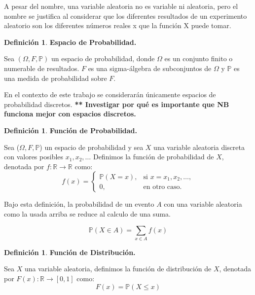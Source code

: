 \documentclass[
 12pt,
 letterpaper,
]{article}
\theoremstyle{teoremaBreak}
\theoremstyle{plain}
\theoremstyle{definition}
\newtheorem{definicion}[teorema]{Definición}
\begin{document}
A pesar del nombre, una variable aleatoria no es variable ni aleatoria,
pero el nombre se justifica al considerar que los diferentes resultados
de un experimento aleatorio son los diferentes números reales x que la
función X puede tomar.

\begin{definicion}
\textbf{Espacio de Probabilidad.}  

Sea $(\Omega,F,\mathbb{P})$ un espacio de probabilidad, donde $\Omega$ es un conjunto finito o
numerable de resultados. $F$ es una sigma-álgebra de subconjuntos de $\Omega$
y $\mathbb{P}$ es una medida de probabilidad sobre $F$.

En el contexto de este trabajo se considerarán únicamente espacios de
probabilidad discretos. \textbf{** Investigar por qué es importante que
NB funciona mejor con espacios discretos.}
\end{definicion}

\begin{definicion}
\textbf{Función de Probabilidad.}

Sea ($\Omega, F, \mathbb{P}$) un espacio de probabilidad y sea $X$ una variable aleatoria discreta con valores posibles $x_1, x_2, \ldots$ Definimos la función de 
probabilidad de $X$, denotada por $f: \mathbb{R} \to \mathbb{R}$ como:
\[
f(x)=
\begin{cases}
\mathbb{P}(X = x), & \text{si } x = x_1, x_2, \ldots, \\
0, & \text{en otro caso.}
\end{cases}
\]
\end{definicion}

Bajo esta definición, la probabilidad de un evento $A$ con una variable aleatoria como la usada 
arriba se reduce al calculo de una suma.

$$\mathbb{P}(X \in A) = \sum_{x \in A} f(x)$$

\begin{definicion}
\textbf{Función de Distribución.}

Sea $X$ una variable aleatoria, definimos la función de distribución de $X$, denotada por
 $F(x): \mathbb{R} \to [0,1]$ como:
$$F(x) = \mathbb{P}(X \leq x)$$
\end{definicion}
\medskip
\end{document}
